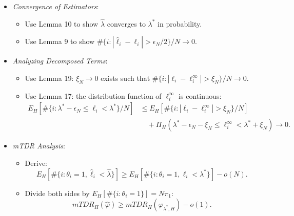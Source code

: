 \documentclass[10pt, aspectratio=169]{beamer}
\begin{document}
\begin{frame}
    \begin{itemize}[label=\scalebox{0.5}{$\bullet$}]
        \item \textit{Convergence of Estimators}:
            \begin{itemize}[label=\scalebox{0.5}{$\bullet$}]
                \setlength{\itemsep}{\baselineskip}
                \item Use Lemma 10 to show \(\hat{\lambda}\) converges to \(\lambda^*\) in probability.
                \item Use Lemma 9 to show \(\#\{i : |\hat{\ell}_i - \ell_i| > \epsilon_N/2\}/N \to 0\).
            \end{itemize}

        \item \textit{Analyzing Decomposed Terms}:
            \begin{itemize}[label=\scalebox{0.5}{$\bullet$}]
                \setlength{\itemsep}{\baselineskip}
                \item Use Lemma 19: \(\xi_N \to 0\) exists such that \(\#\{i : |\ell_i - \ell^\infty_i| > \xi_N\}/N \to 0\).
                \item Use Lemma 17: the distribution function of \(\ell^\infty_i\) is continuous:
                \begin{align*}
                E_H\left[\#\{i : \lambda^* - \epsilon_N \leq \ell_i < \lambda^*\}/N\right] 
                &\leq E_H\left[\#\{i : |\ell_i - \ell^\infty_i| > \xi_N\}/N\right] \\
                &\quad + \Pi_H(\lambda^* - \epsilon_N - \xi_N \leq \ell^\infty_i < \lambda^* + \xi_N) \to 0.
                \end{align*}
            \end{itemize}

        \item \textit{mTDR Analysis}:
            \begin{itemize}[label=\scalebox{0.5}{$\bullet$}]
                \setlength{\itemsep}{\baselineskip}
                \item Derive:
                \[
                E_H[\#\{i : \theta_i = 1, \hat{\ell}_i < \hat{\lambda}\}] \geq E_H[\#\{i : \theta_i = 1, \ell_i < \lambda^*\}] - o(N).
                \]
                \item Divide both sides by \(E_H[\#\{i : \theta_i = 1\}] = N\pi_1\):
                \[
                mTDR_H(\hat{\varphi}) \geq mTDR_H(\varphi_{\lambda^*, H}) - o(1).
                \]
            \end{itemize}

        
    \end{itemize}
\end{frame}
\end{document}
